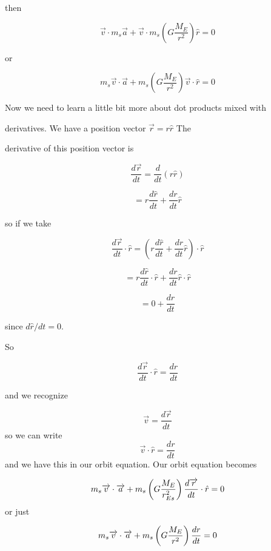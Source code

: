 then 

$$\overrightarrow{v}\cdot m_{s}\overrightarrow{a}+\overrightarrow{v}\cdot m_{s}\left( G\frac{M_{E}}{r^{2}}\right) \hat{r}=0 $$

or

$$m_{s}\overrightarrow{v}\cdot \overrightarrow{a}+m_{s}\left( G\frac{M_{E}}{r^{2}}\right) \overrightarrow{v}\cdot \hat{r}=0 $$

Now we need to learn a little bit more about dot products mixed with

derivatives. We have a position vector $\overrightarrow{r}=r\hat{r}$ The

derivative of this position vector is 

$$\frac{d\overrightarrow{r}}{dt}=\frac{d}{dt}\left( r\hat{r}\right) $$

$$=r\frac{d\hat{r}}{dt}+\frac{dr}{dt}\hat{r}$$


so if we take 

$$\frac{d\overrightarrow{r}}{dt}\cdot \hat{r}=\left( r\frac{d\hat{r}}{dt}+\frac{dr}{dt}\hat{r}\right) \cdot \hat{r}$$


$$=r\frac{d\hat{r}}{dt}\cdot \hat{r}+\frac{dr}{dt}\hat{r}\cdot \hat{r}$$%

$$=0+\frac{dr}{dt}$$%

since $d\hat{r}/dt=0.$


So 

$$\frac{d\overrightarrow{r}}{dt}\cdot \hat{r}=\frac{dr}{dt}$$

and we recognize 

\begin{equation*}
	\overrightarrow{v}=\frac{d\overrightarrow{r}}{dt}
\end{equation*}%
so we can write 
\begin{equation}
	\overrightarrow{v}\cdot \hat{r}=\frac{dr}{dt}  \label{vdotrhat}
\end{equation}%
and we have this in our orbit equation. Our orbit equation becomes

\begin{equation*}
	m_{s}\overrightarrow{v}\cdot \overrightarrow{a}+m_{s}\left( G\frac{M_{E}}{%
		r_{Es}^{2}}\right) \frac{d\overrightarrow{r}}{dt}\cdot \hat{r}=0
\end{equation*}%
or just

\begin{equation*}
	m_{s}\overrightarrow{v}\cdot \overrightarrow{a}+m_{s}\left( G\frac{M_{E}}{%
		r^{2}}\right) \frac{dr}{dt}=0
\end{equation*}


